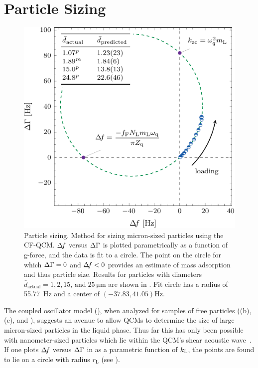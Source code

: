 \section{Particle Sizing}
\begin{figure}[ht]
\centering
\includegraphics{qcm/figures/circlefit.pdf}
\caption{ Particle sizing.  Method for sizing micron-sized particles using the CF-QCM\@.
$\Delta\!f$ versus $\Delta\Gamma$ is plotted parametrically as a function of g-force, and
the data is fit to a circle.  The point on the circle for which $\Delta\Gamma=0$ and
$\Delta\!f<0$ provides an estimate of mass adsorption and thus particle size.
Results for particles with diameters $\bar{d}_\mathrm{actual}=1, 2,
15,\,\mathrm{and}\;\SI{25}{\micro\meter}$ are shown in
.  Fit circle has a radius of \SI{55.77}{\hertz} and
a center of $(-37.83,41.05) \si{\hertz}$. }
\label{fig:circlefit}
\end{figure}

The coupled oscillator model (), when analyzed for
samples of free particles ((b),
(c), and ), suggests an avenue
to allow QCMs to determine the size of large micron-sized particles in the
liquid phase.  Thus far this has only been possible with nanometer-sized
particles which lie within the QCM's shear acoustic
wave~\cite{olsson2013using}.  If one plots $\Delta\!f$ versus $\Delta\Gamma$ in
 as a parametric function of $k_\mathrm{L}$, the points are
found to lie on a circle with radius $r_\mathrm{L}$ (see
).


